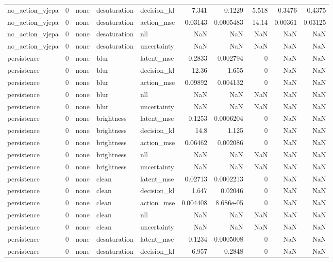 \begin{tabular}{lrlllrrrrr}
no\_action\_vjepa & 0 & none & desaturation & decision\_kl & 7.341 & 0.1229 & 5.518 & 0.3476 & 0.4375 \\
no\_action\_vjepa & 0 & none & desaturation & action\_mse & 0.03143 & 0.0005483 & -14.14 & 0.00361 & 0.03125 \\
no\_action\_vjepa & 0 & none & desaturation & nll & NaN & NaN & NaN & NaN & NaN \\
no\_action\_vjepa & 0 & none & desaturation & uncertainty & NaN & NaN & NaN & NaN & NaN \\
persistence & 0 & none & blur & latent\_mse & 0.2833 & 0.002794 & 0 & NaN & NaN \\
persistence & 0 & none & blur & decision\_kl & 12.36 & 1.655 & 0 & NaN & NaN \\
persistence & 0 & none & blur & action\_mse & 0.09892 & 0.004132 & 0 & NaN & NaN \\
persistence & 0 & none & blur & nll & NaN & NaN & NaN & NaN & NaN \\
persistence & 0 & none & blur & uncertainty & NaN & NaN & NaN & NaN & NaN \\
persistence & 0 & none & brightness & latent\_mse & 0.1253 & 0.0006204 & 0 & NaN & NaN \\
persistence & 0 & none & brightness & decision\_kl & 14.8 & 1.125 & 0 & NaN & NaN \\
persistence & 0 & none & brightness & action\_mse & 0.06462 & 0.002086 & 0 & NaN & NaN \\
persistence & 0 & none & brightness & nll & NaN & NaN & NaN & NaN & NaN \\
persistence & 0 & none & brightness & uncertainty & NaN & NaN & NaN & NaN & NaN \\
persistence & 0 & none & clean & latent\_mse & 0.02713 & 0.0002213 & 0 & NaN & NaN \\
persistence & 0 & none & clean & decision\_kl & 1.647 & 0.02046 & 0 & NaN & NaN \\
persistence & 0 & none & clean & action\_mse & 0.004408 & 8.686e-05 & 0 & NaN & NaN \\
persistence & 0 & none & clean & nll & NaN & NaN & NaN & NaN & NaN \\
persistence & 0 & none & clean & uncertainty & NaN & NaN & NaN & NaN & NaN \\
persistence & 0 & none & desaturation & latent\_mse & 0.1234 & 0.0005008 & 0 & NaN & NaN \\
persistence & 0 & none & desaturation & decision\_kl & 6.957 & 0.2848 & 0 & NaN & NaN \\

\end{tabular}
